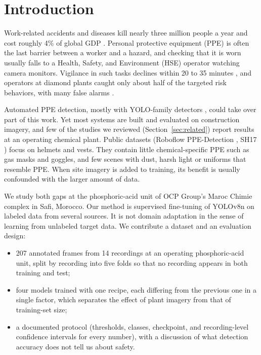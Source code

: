 \section{Introduction}\label{sec:intro}

Work-related accidents and diseases kill nearly three million people a year and cost roughly 4\% of global GDP \cite{ilo2023}. Personal protective equipment (PPE) is often the last barrier between a worker and a hazard, and checking that it is worn usually falls to a Health, Safety, and Environment (HSE) operator watching camera monitors. Vigilance in such tasks declines within 20 to 35 minutes \cite{parasuraman1984}, and operators at diamond plants caught only about half of the targeted risk behaviors, with many false alarms \cite{donald2015}.

Automated PPE detection, mostly with YOLO-family detectors \cite{ultralytics2023,ppeyolo2024,edgeyolo2024}, could take over part of this work. Yet most systems are built and evaluated on construction imagery, and few of the studies we reviewed (Section~\ref{sec:related}) report results at an operating chemical plant. Public datasets (Roboflow PPE-Detection \cite{roboflowppe}, SH17 \cite{ahmad2024sh17}) focus on helmets and vests. They contain little chemical-specific PPE such as gas masks and goggles, and few scenes with dust, harsh light or uniforms that resemble PPE. When site imagery is added to training, its benefit is usually confounded with the larger amount of data.

We study both gaps at the phosphoric-acid unit of OCP Group's Maroc Chimie complex in Safi, Morocco. Our method is supervised fine-tuning of YOLOv8n on labeled data from several sources. It is not domain adaptation in the sense of learning from unlabeled target data. We contribute a dataset and an evaluation design:
\begin{itemize}
  \item 207 annotated frames from 14 recordings at an operating phosphoric-acid unit, split by recording into five folds so that no recording appears in both training and test;
  \item four models trained with one recipe, each differing from the previous one in a single factor, which separates the effect of plant imagery from that of training-set size;
  \item a documented protocol (thresholds, classes, checkpoint, and recording-level confidence intervals for every number), with a discussion of what detection accuracy does not tell us about safety.
\end{itemize}
